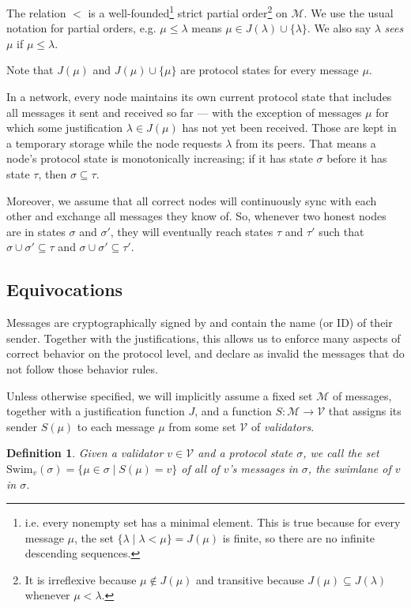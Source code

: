 \documentclass[12pt]{article}
\newtheorem{definition}{Definition}
\begin{document}
The relation $<$ is a well-founded\footnote{i.e. every nonempty set has a minimal element. This is true because for every message $\mu$, the set $\{ \lambda \mid \lambda < \mu \} = J(\mu)$ is finite, so there are no infinite descending sequences.} strict partial order\footnote{It is irreflexive because $\mu \notin J(\mu)$ and transitive because $J(\mu) \subseteq J(\lambda)$ whenever $\mu < \lambda$.} on $\mathcal{M}$. We use the usual notation for partial orders, e.g. $\mu \leq \lambda$ means $\mu \in J(\lambda) \cup \{\lambda\}$. We also say $\lambda$ \emph{sees} $\mu$ if $\mu \leq \lambda$.

Note that $J(\mu)$ and $J(\mu) \cup \{\mu\}$ are protocol states for every message $\mu$.

In a network, every node maintains its own current protocol state that includes all messages it sent and received so far — with the exception of messages $\mu$ for which some justification $\lambda \in J(\mu)$ has not yet been received. Those are kept in a temporary storage while the node requests $\lambda$ from its peers. That means a node's protocol state is monotonically increasing; if it has state $\sigma$ before it has state $\tau$, then $\sigma \subseteq \tau$.

Moreover, we assume that all correct nodes will continuously sync with each other and exchange all messages they know of. So, whenever two honest nodes are in states $\sigma$ and $\sigma'$, they will eventually reach states $\tau$ and $\tau'$ such that $\sigma \cup \sigma' \subseteq \tau$ and $\sigma \cup \sigma' \subseteq \tau'$.


\subsection{Equivocations}

Messages are cryptographically signed by and contain the name (or ID) of their sender. Together with the justifications, this allows us to enforce many aspects of correct behavior on the protocol level, and declare as invalid the messages that do not follow those behavior rules.

Unless otherwise specified, we will implicitly assume a fixed set $\mathcal{M}$ of messages, together with a justification function $J$, and a function $S: \mathcal{M} \rightarrow \mathcal{V}$ that assigns its sender $S(\mu)$ to each message $\mu$ from some set $\mathcal{V}$ of \emph{validators}.

\begin{definition}
Given a validator $v \in \mathcal{V}$ and a protocol state $\sigma$, we call the set $\mathrm{Swim}_v(\sigma) = \{ \mu \in \sigma \mid S(\mu) = v \}$ of all of $v$'s messages in $\sigma$, the \emph{swimlane of $v$ in $\sigma$}.
\end{definition}
\end{document}
